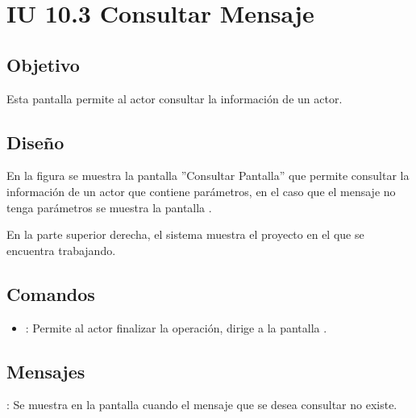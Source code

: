 \section{IU 10.3 Consultar Mensaje}

\subsection{Objetivo}
	Esta pantalla permite al actor consultar la información de un actor.
\subsection{Diseño}
	En la figura  se muestra la pantalla ''Consultar Pantalla'' que permite consultar la información de un actor que contiene parámetros, en el caso que el mensaje no tenga parámetros se muestra la pantalla .
	
	En la parte superior derecha, el sistema muestra el proyecto en el que se encuentra trabajando.

\subsection{Comandos}
\begin{itemize}
	\item {}: Permite al actor finalizar la operación, dirige a la pantalla .
\end{itemize}

\subsection{Mensajes}

\begin{Citemize}
	\item {}: Se muestra en la pantalla  cuando el mensaje que se desea consultar no existe.
\end{Citemize}
